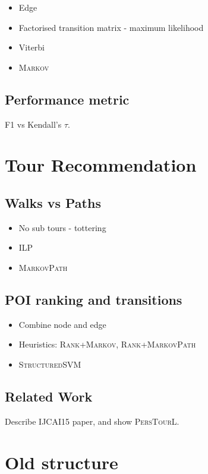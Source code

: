 \begin{itemize}
  \item Edge
  \item Factorised transition matrix - maximum likelihood
  \item Viterbi
  \item \textsc{Markov}
\end{itemize}

\subsection{Performance metric}

F1 vs Kendall's $\tau$.

\section{Tour Recommendation}


\subsection{Walks vs Paths}

\begin{itemize}
  \item No sub tours - tottering
  \item ILP
  \item \textsc{MarkovPath}
\end{itemize}

\subsection{POI ranking and transitions}

\begin{itemize}
  \item Combine node and edge
  \item Heuristics: \textsc{Rank+Markov}, \textsc{Rank+MarkovPath}
  \item \textsc{StructuredSVM}
\end{itemize}

\subsection{Related Work}

Describe IJCAI15 paper, and show \textsc{PersTourL}.

\section{Old structure}
